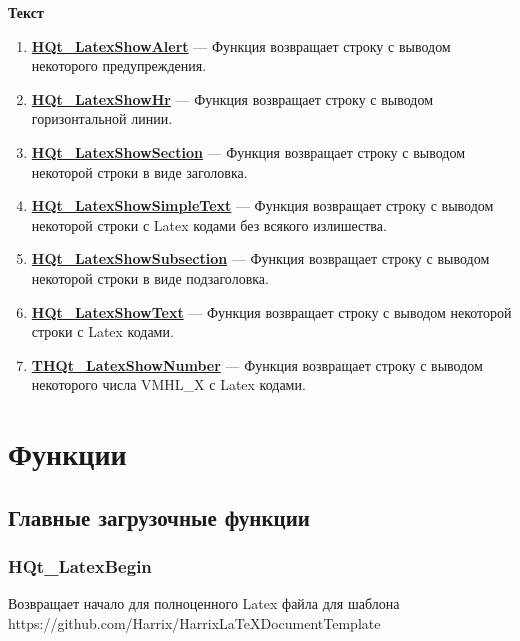 \documentclass[a4paper,12pt]{article}
\begin{document}
\textbf{Текст}
\begin{enumerate}

\item \textbf{\hyperref[HQt_LatexShowAlert]{HQt\_LatexShowAlert}} --- Функция возвращает строку с выводом некоторого предупреждения.

\item \textbf{\hyperref[HQt_LatexShowHr]{HQt\_LatexShowHr}} --- Функция возвращает строку с выводом горизонтальной линии.

\item \textbf{\hyperref[HQt_LatexShowSection]{HQt\_LatexShowSection}} --- Функция возвращает строку с выводом некоторой строки в виде заголовка.

\item \textbf{\hyperref[HQt_LatexShowSimpleText]{HQt\_LatexShowSimpleText}} --- Функция возвращает строку с выводом некоторой строки с Latex кодами без всякого излишества.

\item \textbf{\hyperref[HQt_LatexShowSubsection]{HQt\_LatexShowSubsection}} --- Функция возвращает строку с выводом некоторой строки в виде подзаголовка.

\item \textbf{\hyperref[HQt_LatexShowText]{HQt\_LatexShowText}} --- Функция возвращает строку с выводом некоторой строки с Latex кодами.

\item \textbf{\hyperref[THQt_LatexShowNumber]{THQt\_LatexShowNumber}} --- Функция возвращает строку с выводом некоторого числа VMHL\_X с Latex кодами.

\end{enumerate}


\newpage
\section{Функции}
\subsection{Главные загрузочные функции}

\subsubsection{HQt\_LatexBegin}\label{HQt_LatexBegin}

Возвращает начало для полноценного Latex файла для шаблона https://github.com/Harrix/HarrixLaTeXDocumentTemplate
\end{document}
